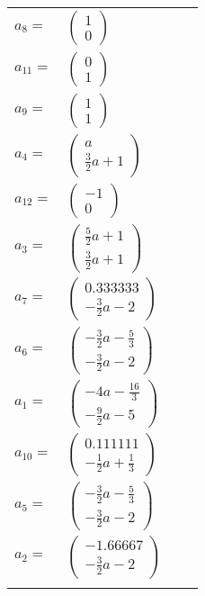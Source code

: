 \documentclass[1p]{elsarticle_modified}
\theoremstyle{definition}
\begin{document}
\begin{tabular}{m{7pt} m{180pt} m{7pt} m{180pt} }
\flushright $a_{8}=$&$\begin{pmatrix}1\\0\end{pmatrix}$ \\
\flushright $a_{11}=$&$\begin{pmatrix}0\\1\end{pmatrix}$ \\
\flushright $a_{9}=$&$\begin{pmatrix}1\\1\end{pmatrix}$ \\
\flushright $a_{4}=$&$\begin{pmatrix}a\\\frac{3}{2} a+1\end{pmatrix}$ \\
\flushright $a_{12}=$&$\begin{pmatrix}-1\\0\end{pmatrix}$ \\
\flushright $a_{3}=$&$\begin{pmatrix}\frac{5}{2} a+1\\\frac{3}{2} a+1\end{pmatrix}$ \\
\flushright $a_{7}=$&$\begin{pmatrix}0.333333\\-\frac{3}{2} a-2\end{pmatrix}$ \\
\flushright $a_{6}=$&$\begin{pmatrix}-\frac{3}{2} a-\frac{5}{3}\\-\frac{3}{2} a-2\end{pmatrix}$ \\
\flushright $a_{1}=$&$\begin{pmatrix}-4 a-\frac{16}{3}\\-\frac{9}{2} a-5\end{pmatrix}$ \\
\flushright $a_{10}=$&$\begin{pmatrix}0.111111\\-\frac{1}{2} a+\frac{1}{3}\end{pmatrix}$ \\
\flushright $a_{5}=$&$\begin{pmatrix}-\frac{3}{2} a-\frac{5}{3}\\-\frac{3}{2} a-2\end{pmatrix}$ \\
\flushright $a_{2}=$&$\begin{pmatrix}-1.66667\\-\frac{3}{2} a-2\end{pmatrix}$\\&\end{tabular}
\end{document}
